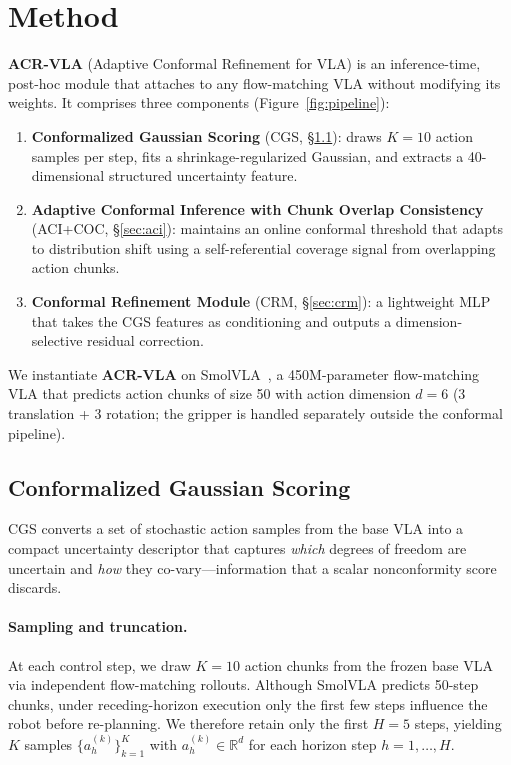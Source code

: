 
\section{Method}
\label{sec:method}

\textbf{ACR-VLA} (Adaptive Conformal Refinement for VLA) is an inference-time, post-hoc module that attaches to any flow-matching VLA without modifying its weights.  It comprises three components (Figure~\ref{fig:pipeline}):
\begin{enumerate}[nosep]
  \item \textbf{Conformalized Gaussian Scoring} (CGS, \S\ref{sec:cgs}): draws $K{=}10$ action samples per step, fits a shrinkage-regularized Gaussian, and extracts a 40-dimensional structured uncertainty feature.
  \item \textbf{Adaptive Conformal Inference with Chunk Overlap Consistency} (ACI+COC, \S\ref{sec:aci}): maintains an online conformal threshold that adapts to distribution shift using a self-referential coverage signal from overlapping action chunks.
  \item \textbf{Conformal Refinement Module} (CRM, \S\ref{sec:crm}): a lightweight MLP that takes the CGS features as conditioning and outputs a dimension-selective residual correction.
\end{enumerate}

We instantiate \textbf{ACR-VLA} on SmolVLA~\cite{shukor2025smolvla}, a 450M-parameter flow-matching VLA that predicts action chunks of size 50 with action dimension $d{=}6$ (3 translation + 3 rotation; the gripper is handled separately outside the conformal pipeline).


\subsection{Conformalized Gaussian Scoring}
\label{sec:cgs}

CGS converts a set of stochastic action samples from the base VLA into a compact uncertainty descriptor that captures \emph{which} degrees of freedom are uncertain and \emph{how} they co-vary---information that a scalar nonconformity score discards.

\paragraph{Sampling and truncation.}
At each control step, we draw $K{=}10$ action chunks from the frozen base VLA via independent flow-matching rollouts.  Although SmolVLA predicts 50-step chunks, under receding-horizon execution only the first few steps influence the robot before re-planning.  We therefore retain only the first $H{=}5$ steps, yielding $K$ samples $\{a_h^{(k)}\}_{k=1}^{K}$ with $a_h^{(k)}\in\mathbb{R}^{d}$ for each horizon step $h=1,\dots,H$.

